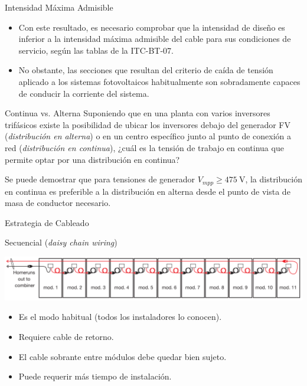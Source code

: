 \documentclass[aspectratio=169, usenames,svgnames,dvipsnames]{beamer}
\begin{document}
\begin{frame}[label={sec:orgafe5267}]{Intensidad Máxima Admisible}
\begin{itemize}
\item Con este resultado, es necesario comprobar que la intensidad de diseño es inferior a la intensidad máxima admisible del cable para sus condiciones de servicio, según las tablas de la ITC-BT-07.

\item No obstante, las secciones que resultan del criterio de caída de tensión aplicado a los sistemas fotovoltaicos habitualmente son sobradamente capaces de conducir la corriente del sistema.
\end{itemize}
\end{frame}

\begin{frame}[label={sec:org4557215}]{Continua vs. Alterna}
Suponiendo que en una planta con varios inversores trifásicos existe la
posibilidad de ubicar los inversores debajo del generador FV
(\emph{distribución en alterna}) o en un centro específico junto al punto de
conexión a red (\emph{distribución en continua}), \alert{¿cuál es la tensión de
trabajo en continua que permite optar por una distribución en continua?}

Se puede demostrar que para tensiones de generador \(V_{mpp} \geq
\qty{475}{\volt}\), la distribución en continua es preferible a la
distribución en alterna desde el punto de vista de masa de conductor
necesario.
\end{frame}


\begin{frame}[label={sec:orgcdc786e}]{Estrategia de Cableado}
\begin{block}{Secuencial (\emph{daisy chain wiring})}
\begin{center}
\includegraphics[width=\textwidth]{../figs/DaisyChainWiring.png}
\end{center}

\begin{itemize}
\item Es el modo habitual (todos los instaladores lo conocen).
\item Requiere cable de retorno.
\item El cable sobrante entre módulos debe quedar bien sujeto.
\item Puede requerir más tiempo de instalación.
\end{itemize}
\end{block}
\end{frame}
\end{document}

